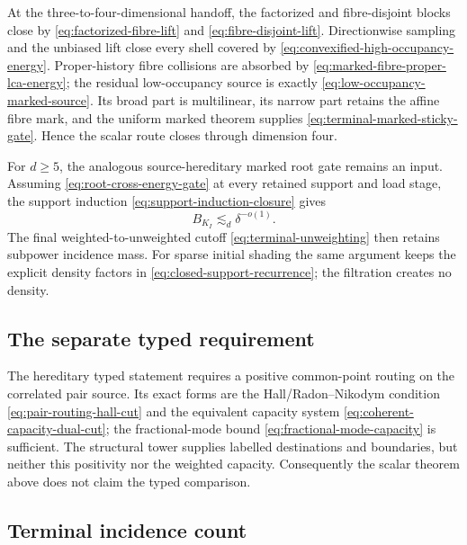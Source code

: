 \documentclass[11pt]{article}
\begin{document}
At the three-to-four-dimensional handoff, the factorized and fibre-disjoint
blocks close by \eqref{eq:factorized-fibre-lift} and
\eqref{eq:fibre-disjoint-lift}.  Directionwise sampling and the unbiased lift
close every shell covered by
\eqref{eq:convexified-high-occupancy-energy}.  Proper-history fibre collisions
are absorbed by \eqref{eq:marked-fibre-proper-lca-energy}; the residual
low-occupancy source is exactly
\eqref{eq:low-occupancy-marked-source}.  Its broad part is multilinear, its
narrow part retains the affine fibre mark, and the uniform marked theorem
\cite{StickyContact4D} supplies
\eqref{eq:terminal-marked-sticky-gate}.  Hence the scalar route closes through
dimension four.

For \(d\ge5\), the analogous source-hereditary marked root gate remains an
input.  Assuming \eqref{eq:root-cross-energy-gate} at every retained support
and load stage, the support induction
\eqref{eq:support-induction-closure} gives
\[
 B_{K_I}\lesssim_d\delta^{-o(1)}.
\]
The final weighted-to-unweighted cutoff
\eqref{eq:terminal-unweighting} then retains subpower incidence mass.  For
sparse initial shading the same argument keeps the explicit density factors in
\eqref{eq:closed-support-recurrence}; the filtration creates no density.

\subsection{The separate typed requirement}

The hereditary typed statement requires a positive common-point routing on the
correlated pair source.  Its exact forms are the Hall/Radon--Nikodym condition
\eqref{eq:pair-routing-hall-cut} and the equivalent capacity system
\eqref{eq:coherent-capacity-dual-cut}; the fractional-mode bound
\eqref{eq:fractional-mode-capacity} is sufficient.  The structural tower
supplies labelled destinations and boundaries, but neither this positivity nor
the weighted capacity.  Consequently the scalar theorem above does not claim
the typed comparison.

\subsection{Terminal incidence count}
\end{document}
